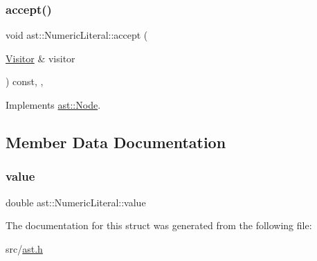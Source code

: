 \subsubsection{\texorpdfstring{accept()}{accept()}}
{\footnotesize\ttfamily void ast\+::\+Numeric\+Literal\+::accept (\begin{DoxyParamCaption}\item[{\hyperlink{structast_1_1_visitor}{Visitor} \&}]{visitor }\end{DoxyParamCaption}) const\hspace{0.3cm}{\ttfamily [inline]}, {\ttfamily [override]}, {\ttfamily [virtual]}}



Implements \hyperlink{structast_1_1_node_abc089ee6caaf06a4445ebdd8391fdebc}{ast\+::\+Node}.



\subsection{Member Data Documentation}
\mbox{\label{structast_1_1_numeric_literal_aae02b7a9318e48b594e8262d9256a423}} 
\subsubsection{\texorpdfstring{value}{value}}
{\footnotesize\ttfamily double ast\+::\+Numeric\+Literal\+::value}



The documentation for this struct was generated from the following file\+:\begin{DoxyCompactItemize}
\item 
src/\hyperlink{ast_8h}{ast.\+h}\end{DoxyCompactItemize}
